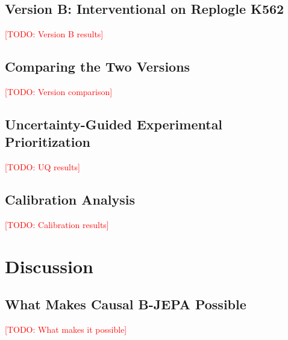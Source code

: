\documentclass[11pt]{article}
\newcommand{\todo}[1]{\textcolor{red}{[TODO: #1]}}
\begin{document}
\subsection{Version B: Interventional on Replogle K562}
\todo{Version B results}

\subsection{Comparing the Two Versions}
\todo{Version comparison}

\subsection{Uncertainty-Guided Experimental Prioritization}
\todo{UQ results}

\subsection{Calibration Analysis}
\todo{Calibration results}

\section{Discussion}

\subsection{What Makes Causal B-JEPA Possible}
\todo{What makes it possible}
\end{document}

